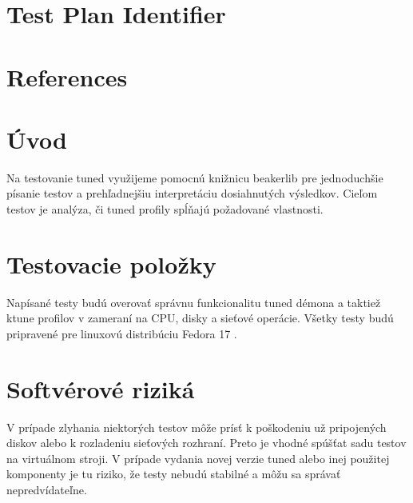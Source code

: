 \section{Test Plan Identifier}
\section{References}

\section{Úvod}
Na testovanie tuned využijeme pomocnú knižnicu beakerlib
\cite{beakerlibHomepage} pre jednoduchšie písanie testov a prehľadnejšiu
interpretáciu dosiahnutých výsledkov. Cieľom testov je analýza, či tuned
profily spĺňajú požadované vlastnosti.

\section{Testovacie položky}
Napísané testy budú overovať správnu funkcionalitu tuned démona a taktiež
ktune profilov v zameraní na CPU, disky a sieťové operácie. Všetky testy budú
pripravené pre linuxovú distribúciu Fedora 17 \cite{fedoraHomepage}.

\section{Softvérové riziká}
V prípade zlyhania niektorých testov môže prísť k poškodeniu už pripojených
diskov alebo k rozladeniu sieťových rozhraní. Preto je vhodné spúšťat sadu
testov na virtuálnom stroji. V prípade vydania novej verzie tuned alebo inej
použitej komponenty je tu riziko, že testy nebudú stabilné a môžu sa správať
nepredvídateľne.

